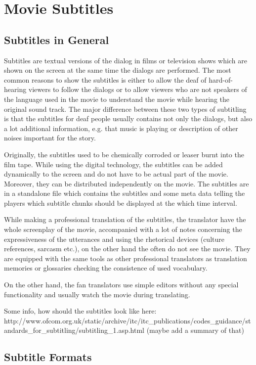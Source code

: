 \section{Movie Subtitles}
\subsection{Subtitles in General}

Subtitles are textual versions of the dialog in films or television shows which are shown on the screen at the same time the dialogs are performed. The most common reasons to show the subtitles is either to allow the deaf of hard-of-hearing viewers to follow the dialogs or to allow viewers who are not speakers of the language used in the movie to understand the movie while hearing the original sound track. The major difference between these two types of subtitling is that the subtitles for deaf people usually contains not only the dialogs, but also a lot additional information, e.g. that music is playing or description of other noises important for the story. 

Originally, the subtitles used to be chemically corroded or leaser burnt into the film tape. While using the digital technology, the subtitles can be added dynamically to the screen and do not have to be actual part of the movie. Moreover, they can be distributed independently on the movie. The subtitles are in a standalone file which contains the subtitles and some meta data telling the players which subtitle chunks should be displayed at the which time interval.

While making a professional translation of the subtitles, the translator have the whole screenplay of the movie, accompanied with a lot of notes concerning the expressiveness of the utterances and using the rhetorical devices (culture references, sarcasm etc.), on the other hand the often do not see the movie. They are equipped with the same tools as other professional translators as translation memories or glossaries checking the consistence of used vocabulary.

On the other hand, the fan translators use simple editors without any special functionality and usually watch the movie during translating.

Some info, how should the subtitles look like here: 
http://www.ofcom.org.uk/static/archive/itc/itc_publications/codes_guidance/standards_for_subtitling/subtitling_1.asp.html
(maybe add a summary of that)

\subsection{Subtitle Formats}
\label{subtitle_formats}

